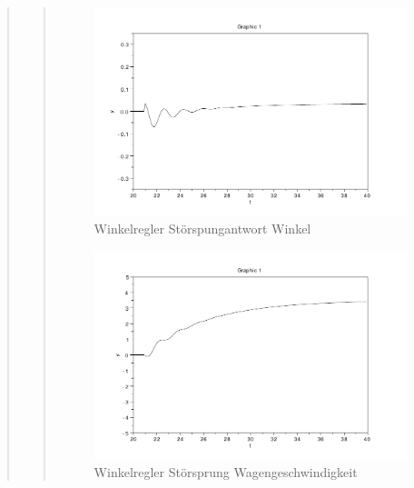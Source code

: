 \begin{quote}
\begin{quote}
        \begin{figure}[H]
        \centering
            \includegraphics[scale=0.7, trim = 0cm 0cm 0cm 0cm, clip]{./Bilder/Winkelregler_Stoer_Winkel}
                \caption{Winkelregler Störspungantwort Winkel}
        \end{figure}
        
        \begin{figure}[H]
        \centering
            \includegraphics[scale=0.7, trim = 0cm 0cm 0cm 0cm, clip]{./Bilder/Winkelregler_Stoer_Wagengeschwindigkeit}
                \caption{Winkelregler Störsprung Wagengeschwindigkeit}
        \end{figure}  
        

\end{quote}
\end{quote}
